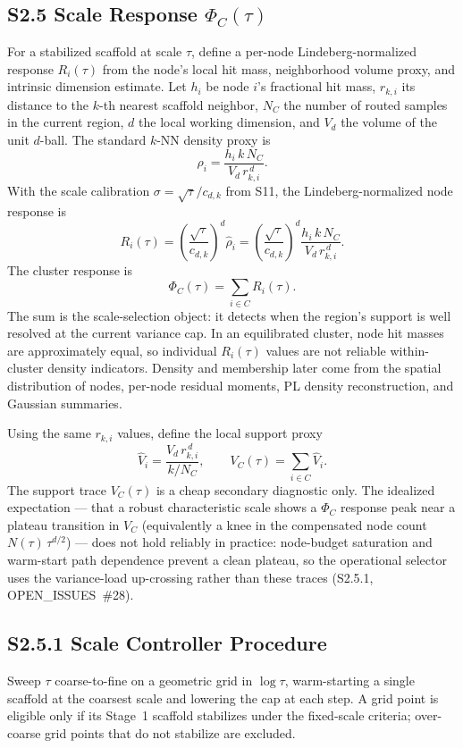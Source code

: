 \documentclass[11pt]{article}
\begin{document}
\subsection*{S2.5 Scale Response $\Phi_C(\tau)$}
\label{sec:si-scale-response}
For a stabilized scaffold at scale $\tau$, define a per-node Lindeberg-normalized response $R_i(\tau)$ from the node's local hit mass, neighborhood volume proxy, and intrinsic dimension estimate. Let $h_i$ be node $i$'s fractional hit mass, $r_{k,i}$ its distance to the $k$-th nearest scaffold neighbor, $N_C$ the number of routed samples in the current region, $d$ the local working dimension, and $V_d$ the volume of the unit $d$-ball. The standard $k$-NN density proxy is
\[
\widehat\rho_i
=
\frac{h_i\,k\,N_C}{V_d\,r_{k,i}^{\,d}}.
\]
With the scale calibration $\sigma=\sqrt{\tau}/c_{d,k}$ from S11, the Lindeberg-normalized node response is
\[
R_i(\tau)
=
\left(\frac{\sqrt{\tau}}{c_{d,k}}\right)^d\widehat\rho_i
=
\left(\frac{\sqrt{\tau}}{c_{d,k}}\right)^d
\frac{h_i\,k\,N_C}{V_d\,r_{k,i}^{\,d}}.
\]
The cluster response is
\[
\Phi_C(\tau)=\sum_{i\in C}R_i(\tau).
\label{eq:si-phi-c}
\]
The sum is the scale-selection object: it detects when the region's support is well resolved at the current variance cap. In an equilibrated cluster, node hit masses are approximately equal, so individual $R_i(\tau)$ values are not reliable within-cluster density indicators. Density and membership later come from the spatial distribution of nodes, per-node residual moments, PL density reconstruction, and Gaussian summaries.

Using the same $r_{k,i}$ values, define the local support proxy
\[
\widehat V_i
=
\frac{V_d\,r_{k,i}^{\,d}}{k/N_C},
\qquad
V_C(\tau)=\sum_{i\in C}\widehat V_i.
\]
The support trace $V_C(\tau)$ is a cheap secondary diagnostic only. The idealized expectation --- that a robust characteristic scale shows a $\Phi_C$ response peak near a plateau transition in $V_C$ (equivalently a knee in the compensated node count $N(\tau)\,\tau^{d/2}$) --- does not hold reliably in practice: node-budget saturation and warm-start path dependence prevent a clean plateau, so the operational selector uses the variance-load up-crossing rather than these traces (S2.5.1, OPEN\_ISSUES~\#28).

\subsection*{S2.5.1 Scale Controller Procedure}
Sweep $\tau$ coarse-to-fine on a geometric grid in $\log\tau$, warm-starting a
single scaffold at the coarsest scale and lowering the cap at each step. A grid
point is eligible only if its Stage~1 scaffold stabilizes under the fixed-scale
criteria; over-coarse grid points that do not stabilize are excluded.
\end{document}
